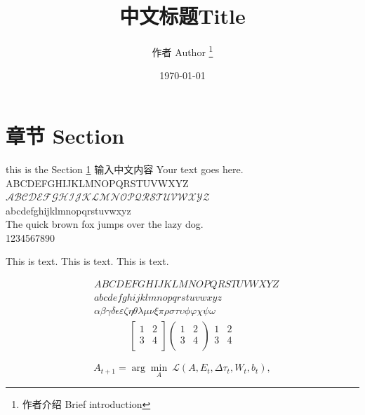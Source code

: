 \documentclass[UTF8,a4paper,10pt, twocolumn]{ctexart}
\title{中文标题Title}
\author{ 作者 Author \thanks{作者介绍 Brief introduction} }
\date{\today}
\begin{document}
	\maketitle
	\thispagestyle{fancy}
	
	
\section{章节 Section} \label{sec:one}
	this is the Section \ref{sec:one}
	输入中文内容 Your text goes here. \\
	ABCDEFGHIJKLMNOPQRSTUVWXYZ \\
	$\mathcal{ABCDEFGHIJKLMNOPQRSTUVWXYZ}$ \\
	abcdefghijklmnopqrstuvwxyz \\
	The quick brown fox jumps over the lazy dog.\\
	1234567890
	
	This is  text.
	This is  text.
	This is  text.

	\listofchanges
	
	\begin{align}
		& ABCDEFGHIJKLMNOPQRSTUVWXYZ \label{eq:alphabet} \\
		& abcdefghijklmnopqrstuvwxyz \\
	& \alpha \beta \gamma \delta \epsilon \varepsilon \zeta \eta \theta \lambda \mu \nu \xi \pi \rho \sigma \tau \upsilon \phi \varphi \chi \psi \omega  
	\end{align}
	\begin{align}
	 \begin{bmatrix}
		1 & 2 \\
		3 & 4 \\
	\end{bmatrix}
	 \begin{pmatrix}
	1 & 2 \\
	3 & 4 \\
	\end{pmatrix}
	 \begin{matrix}
	1 & 2 \\
	3 & 4 \\
	\end{matrix}
	\end{align}
	
	\begin{equation}
	A_{t+1} = \arg\min_A \ \mathcal{L}(A,E_t,\Delta\tau_t,W_t,b_t), \nonumber
	\end{equation}
	
\end{document}
